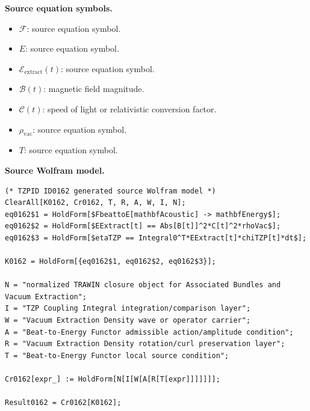 \begin{minipage}[t]{0.49\linewidth}
\begingroup
\small
\raggedright
\textbf{Source equation symbols.}\par
\begin{itemize}[leftmargin=1.35em,itemsep=1pt,topsep=1pt,parsep=0pt]
    \item $\mathcal{F}$: source equation symbol.
    \item $E$: source equation symbol.
    \item $\mathcal{E}_{\mathrm{extract}}(t)$: source equation symbol.
    \item $\mathcal{B}(t)$: magnetic field magnitude.
    \item $\mathcal{C}(t)$: speed of light or relativistic conversion factor.
    \item $\rho_{\mathrm{vac}}$: source equation symbol.
    \item $T$: source equation symbol.
\end{itemize}
\endgroup
\end{minipage}\hfill
\begin{minipage}[t]{0.47\linewidth}
\begingroup
\scriptsize
\raggedright
\textbf{Source Wolfram model.}\par
\begin{Verbatim}[fontsize=\tiny,breaklines=true,breakanywhere=true]
(* TZPID ID0162 generated source Wolfram model *)
ClearAll[K0162, Cr0162, T, R, A, W, I, N];
eq0162$1 = HoldForm[$FbeattoE[mathbfAcoustic] -> mathbfEnergy$];
eq0162$2 = HoldForm[$EExtract[t] == Abs[B[t]]^2*C[t]^2*rhoVac$];
eq0162$3 = HoldForm[$etaTZP == Integral0^T*EExtract[t]*chiTZP[t]*dt$];

K0162 = HoldForm[{eq0162$1, eq0162$2, eq0162$3}];

N = "normalized TRAWIN closure object for Associated Bundles and Vacuum Extraction";
I = "TZP Coupling Integral integration/comparison layer";
W = "Vacuum Extraction Density wave or operator carrier";
A = "Beat-to-Energy Functor admissible action/amplitude condition";
R = "Vacuum Extraction Density rotation/curl preservation layer";
T = "Beat-to-Energy Functor local source condition";

Cr0162[expr_] := HoldForm[N[I[W[A[R[T[expr]]]]]]];

Result0162 = Cr0162[K0162];
\end{Verbatim}
\endgroup
\end{minipage}

